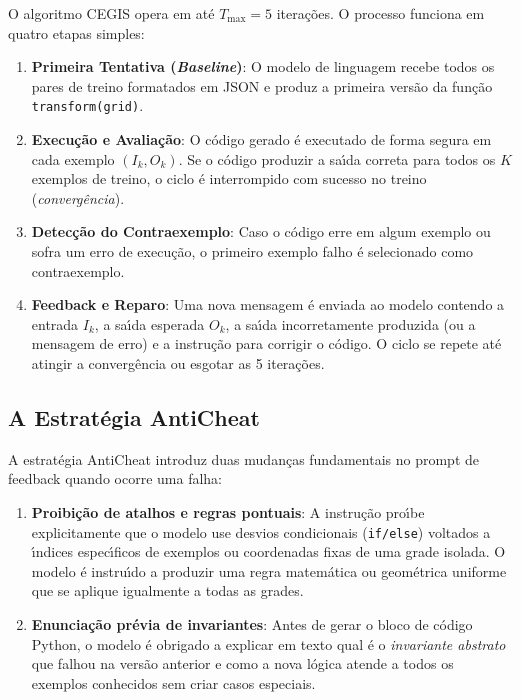 O algoritmo CEGIS opera em at\'{e} $T_{\max} = 5$ itera\c{c}\~{o}es. O processo funciona em quatro etapas simples:
\begin{enumerate}
    \item \textbf{Primeira Tentativa (\textit{Baseline})}: O modelo de linguagem recebe todos os pares de treino formatados em JSON e produz a primeira vers\~{a}o da fun\c{c}\~{a}o \texttt{transform(grid)}.
    \item \textbf{Execu\c{c}\~{a}o e Avalia\c{c}\~{a}o}: O c\'{o}digo gerado \'{e} executado de forma segura em cada exemplo $(I_k, O_k)$. Se o c\'{o}digo produzir a sa\'{\i}da correta para todos os $K$ exemplos de treino, o ciclo \'{e} interrompido com sucesso no treino (\textit{converg\^{e}ncia}).
    \item \textbf{Detec\c{c}\~{a}o do Contraexemplo}: Caso o c\'{o}digo erre em algum exemplo ou sofra um erro de execu\c{c}\~{a}o, o primeiro exemplo falho \'{e} selecionado como contraexemplo.
    \item \textbf{Feedback e Reparo}: Uma nova mensagem \'{e} enviada ao modelo contendo a entrada $I_k$, a sa\'{\i}da esperada $O_k$, a sa\'{\i}da incorretamente produzida (ou a mensagem de erro) e a instru\c{c}\~{a}o para corrigir o c\'{o}digo. O ciclo se repete at\'{e} atingir a converg\^{e}ncia ou esgotar as 5 itera\c{c}\~{o}es.
\end{enumerate}

\subsection{A Estrat\'{e}gia AntiCheat}

A estrat\'{e}gia AntiCheat introduz duas mudan\c{c}as fundamentais no prompt de feedback quando ocorre uma falha:

\begin{enumerate}
    \item \textbf{Proibi\c{c}\~{a}o de atalhos e regras pontuais}: A instru\c{c}\~{a}o pro\'{\i}be explicitamente que o modelo use desvios condicionais (\texttt{if/else}) voltados a \'{\i}ndices espec\'{\i}ficos de exemplos ou coordenadas fixas de uma grade isolada. O modelo \'{e} instru\'{\i}do a produzir uma regra matem\'{a}tica ou geom\'{e}trica uniforme que se aplique igualmente a todas as grades.
    \item \textbf{Enuncia\c{c}\~{a}o pr\'{e}via de invariantes}: Antes de gerar o bloco de c\'{o}digo Python, o modelo \'{e} obrigado a explicar em texto qual \'{e} o \textit{invariante abstrato} que falhou na vers\~{a}o anterior e como a nova l\'{o}gica atende a todos os exemplos conhecidos sem criar casos especiais.
\end{enumerate}

